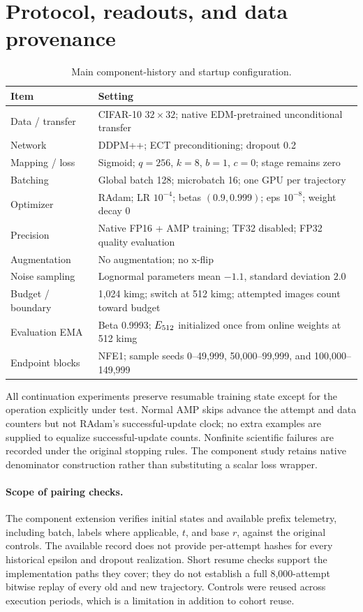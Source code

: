\section{Protocol, readouts, and data provenance}
\label{app:protocol}
\begin{table}[htbp]
\centering\small
\caption{Main component-history and startup configuration.}
\begin{tabularx}{\linewidth}{lY}
\toprule
Item & Setting\\
\midrule
Data / transfer & CIFAR-10 $32\times32$; native EDM-pretrained unconditional transfer\\
Network & DDPM++; ECT preconditioning; dropout 0.2\\
Mapping / loss & Sigmoid; $q=256$, $k=8$, $b=1$, $c=0$; stage remains zero\\
Batching & Global batch 128; microbatch 16; one GPU per trajectory\\
Optimizer & RAdam; LR $10^{-4}$; betas $(0.9,0.999)$; eps $10^{-8}$; weight decay 0\\
Precision & Native FP16 + AMP training; TF32 disabled; FP32 quality evaluation\\
Augmentation & No augmentation; no x-flip\\
Noise sampling & Lognormal parameters mean $-1.1$, standard deviation $2.0$\\
Budget / boundary & 1,024 kimg; switch at 512 kimg; attempted images count toward budget\\
Evaluation EMA & Beta 0.9993; $E_{512}$ initialized once from online weights at 512 kimg\\
Endpoint blocks & NFE1; sample seeds 0--49,999, 50,000--99,999, and 100,000--149,999\\
\bottomrule
\end{tabularx}
\end{table}
All continuation experiments preserve resumable training state except for the operation explicitly under test. Normal AMP skips advance the attempt and data counters but not RAdam's successful-update clock; no extra examples are supplied to equalize successful-update counts. Nonfinite scientific failures are recorded under the original stopping rules. The component study retains native denominator construction rather than substituting a scalar loss wrapper.

\paragraph{Scope of pairing checks.}
The component extension verifies initial states and available prefix telemetry, including batch, labels where applicable, $t$, and base $r$, against the original controls. The available record does not provide per-attempt hashes for every historical epsilon and dropout realization. Short resume checks support the implementation paths they cover; they do not establish a full 8,000-attempt bitwise replay of every old and new trajectory. Controls were reused across execution periods, which is a limitation in addition to cohort reuse.

